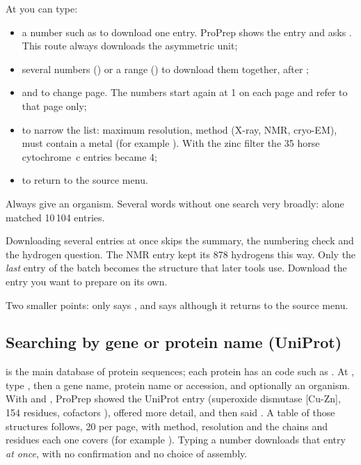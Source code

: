 At  you can type:
\begin{itemize}
  \item a number such as  to download one entry. ProPrep shows the
        entry and asks . This route always
        downloads the asymmetric unit;
  \item several numbers () or a range () to download them
        together, after ;
  \item {} and  to change page. The numbers start again
        at 1 on each page and refer to that page only;
  \item {} to narrow the list:  maximum resolution,
         method (X-ray, NMR, cryo-EM),  must contain a metal
        (for example ). With the zinc filter the 35 horse
        cytochrome~c entries became 4;
  \item {} to return to the source menu.
\end{itemize}

\begin{tip}
Always give an organism. Several words without one search very broadly:
 alone matched 10\,104 entries.
\end{tip}

\begin{watchout}
Downloading several entries at once skips the summary, the numbering check and
the hydrogen question. The NMR entry  kept its 878 hydrogens this way.
Only the \emph{last} entry of the batch becomes the structure that later tools
use. Download the entry you want to prepare on its own.
\end{watchout}

Two smaller points:  only says
, and  says
 although it returns to the source
menu.

\subsection{Searching by gene or protein name (UniProt)}

 is the main database of protein sequences; each protein has an
 code such as . At , type
, then a gene name, protein name or accession, and optionally an
organism. With  and , ProPrep showed the UniProt entry
(superoxide dismutase [Cu-Zn], 154 residues, cofactors
), offered more detail, and then said
. A table of those
structures follows, 20 per page, with method, resolution and the chains and
residues each one covers (for example ). Typing a number
downloads that entry \emph{at once}, with no confirmation and no choice of
assembly.


